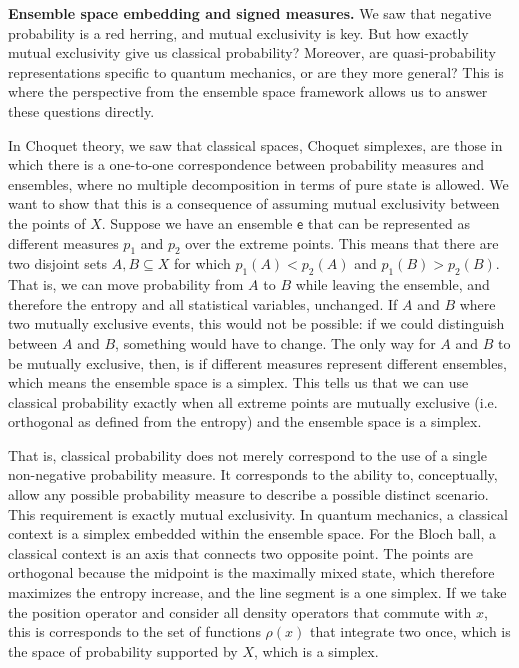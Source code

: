\documentclass[10pt,twocolumn, nofootinbib]{revtex4-2}
\newcommand{\ens}[1][e] {\mathsf{#1}} %
\begin{document}

\textbf{Ensemble space embedding and signed measures.} We saw that negative probability is a red herring, and mutual exclusivity is key. But how exactly mutual exclusivity give us classical probability? Moreover, are quasi-probability representations specific to quantum mechanics, or are they more general? This is where the perspective from the ensemble space framework allows us to answer these questions directly.

In Choquet theory, we saw that classical spaces, Choquet simplexes, are those in which there is a one-to-one correspondence between probability measures and ensembles, where no multiple decomposition in terms of pure state is allowed. We want to show that this is a consequence of assuming mutual exclusivity between the points of $X$. Suppose we have an ensemble $\ens$ that can be represented as different measures $p_1$ and $p_2$ over the extreme points. This means that there are two disjoint sets $A, B \subseteq X$ for which $p_1(A) < p_2(A)$ and $p_1(B) > p_2(B)$. That is, we can move probability from $A$ to $B$ while leaving the ensemble, and therefore the entropy and all statistical variables, unchanged. If $A$ and $B$ where two mutually exclusive events, this would not be possible: if we could distinguish between $A$ and $B$, something would have to change. The only way for $A$ and $B$ to be mutually exclusive, then, is if different measures represent different ensembles, which means the ensemble space is a simplex. This tells us that we can use classical probability exactly when all extreme points are mutually exclusive (i.e. orthogonal as defined from the entropy) and the ensemble space is a simplex.

That is, classical probability does not merely correspond to the use of a single non-negative probability measure. It corresponds to the ability to, conceptually, allow any possible probability measure to describe a possible distinct scenario. This requirement is exactly mutual exclusivity. In quantum mechanics, a classical context is a simplex embedded within the ensemble space. For the Bloch ball, a classical context is an axis that connects two opposite point. The points are orthogonal because the midpoint is the maximally mixed state, which therefore maximizes the entropy increase, and the line segment is a one simplex. If we take the position operator and consider all density operators that commute with $x$, this is corresponds to the set of functions $\rho(x)$ that integrate two once, which is the space of probability supported by $X$, which is a simplex.
\end{document}
